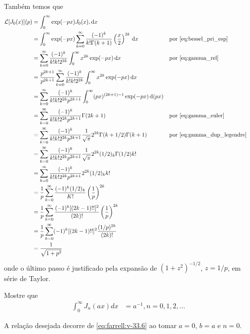 \documentclass[a4paper,12pt, leqno, answers]{exam}
\begin{document}
\begin{questions}
\begin{solution}
        Tamb\'{e}m temos que
        \begin{align*}
            \mathcal{L}[J_0(x)](p) &= \int_0^\infty \exp(-p x) J_0(x) ,\mathrm{d}x \\
            &= \int_0^\infty \exp(-p x) \sum_{k = 0}^\infty \frac{(-1)^k}{k! \Gamma(k + 1)} \left( \frac{x}{2} \right)^{2k} \,\mathrm{d}x && \text{por \eqref{eq:bessel_pri_esp}} \\
            &= \sum_{k = 0}^\infty \frac{(-1)^k}{k! k! 2^{2k}} \int_0^\infty x^{2k} \exp(-p x) \,\mathrm{d}x && \text{por \eqref{eq:gamma_rel}} \\
            &= \frac{p^{2k + 1}}{p^{2k + 1}} \sum_{k = 0}^\infty \frac{(-1)^k}{k! k! 2^{2k}} \int_0^\infty x^{2k} \exp(-p x) \,\mathrm{d}x \\
            &= \sum_{k = 0}^\infty \frac{(-1)^k}{k! k! 2^{2k} p^{2k + 1}} \int_0^\infty (px)^{(2k + 1) - 1} \exp(-p x) \,\mathrm{d}(px) \\
            &= \sum_{k = 0}^\infty \frac{(-1)^k}{k! k! 2^{2k} p^{2k + 1}} \Gamma(2 k + 1) && \text{por \eqref{eq:gamma_euler}} \\
            &= \sum_{k = 0}^\infty \frac{(-1)^k}{k! k! 2^{2k} p^{2k + 1}} \frac{1}{\sqrt{\pi}} 2^{2k} \Gamma(k + 1/2) \Gamma(k + 1) && \text{por \eqref{eq:gamma_dup_legendre}} \\
            &= \sum_{k = 0}^\infty \frac{(-1)^k}{k! k! 2^{2k} p^{2k + 1}} \frac{1}{\sqrt{\pi}} 2^{2k} (1/2)_k \Gamma(1/2) k! \\
            &= \sum_{k = 0}^\infty \frac{(-1)^k}{k! k! 2^{2k} p^{2k + 1}} 2^{2k} (1/2)_k k! \\
            &= \frac{1}{p} \sum_{k = 0}^\infty \frac{(-1)^k (1/2)_k}{K!} \left( \frac{1}{p} \right)^{2k} \\
            &= \frac{1}{p} \sum_{k = 0}^\infty \frac{(-1)^k [(2k - 1)!!]^2}{(2k)!} \left( \frac{1}{p} \right)^{2k} \\
            &= \frac{1}{p} \sum_{k = 0}^\infty (-1)^k [(2k - 1)!!]^2 \frac{(1/p)^{2k}}{(2k)!} \\
            &= \frac{1}{\sqrt{1 + p^2}}
        \end{align*}
        onde o \'{u}ltimo passo \'{e} justificado pela expans\~{a}o de $(1 + z^2)^{-1/2}$, $z = 1/p$, em s\'{e}rie de Taylor.
    \end{solution}

    \question Mostre que
    \begin{align*}
        \int_0^\infty J_n(ax) dx &= a^{-1}, n = 0, 1, 2, \ldots
    \end{align*}
    \begin{solution}
        A rela\c{c}\~{a}o desejada decorre de \eqref{eq:farrell:v-33.6} ao tomar $a = 0$, $b = a$ e $n = 0$.


\end{solution}
\end{questions}
\end{document}
